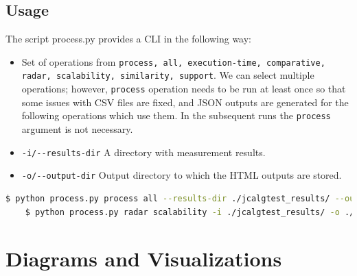 \section{Usage}
The script process.py provides a CLI in the following way:

\begin{itemize}
    \item Set of operations from \texttt{process, all, execution-time, comparative, radar, scalability, similarity, support}. We can select multiple operations; however, \texttt{process} operation needs to be run at least once so that some issues with CSV files are fixed, and JSON outputs are generated for the following operations which use them. In the subsequent runs the \texttt{process} argument is not necessary.
    \item \texttt{-i/-{}-results-dir} A directory with measurement results.
    \item \texttt{-o/-{}-output-dir} Output directory to which the HTML outputs are stored.
\end{itemize}

\begin{lstlisting}[language=bash]
    $ python process.py process all --results-dir ./jcalgtest_results/ --output-dir ./jcalgtest_results/javacard/web
    $ python process.py radar scalability -i ./jcalgtest_results/ -o ./jcalgtest_results/javacard/web
\end{lstlisting}

\renewcommand{\thechapter}{B}
\chapter{Diagrams and Visualizations}\label{appendix:diagrams-visualizations}


